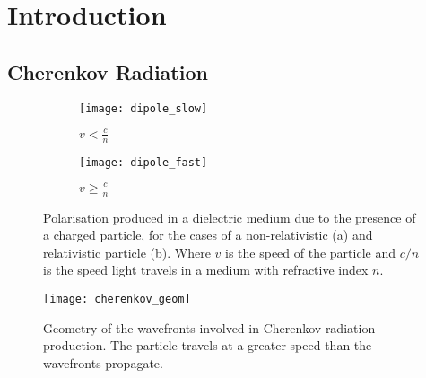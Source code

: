 \chapter{\label{ch1-intro}Introduction} 

\minitoc

\section{Cherenkov Radiation}

\begin{figure}
  \begin{subfigure}[b]{0.49\textwidth}
    \texttt{[image: dipole\_slow]}
    \caption{$v < \frac{c}{n}$}
    \label{fig:dipole_slow}
  \end{subfigure}
  \hfill
  \begin{subfigure}[b]{0.49\textwidth}
    \texttt{[image: dipole\_fast]}
    \caption{$v \ge \frac{c}{n}$}
    \label{fig:dipole_fast}
  \end{subfigure}
  \caption[Polarisation produced in a dielectric medium due to the presence of a charged particle.]{Polarisation produced in a dielectric medium due to the presence of a charged particle, for the cases of a non-relativistic (a) and relativistic particle (b). Where $v$ is the speed of the particle and $c/n$ is the speed light travels in a medium with refractive index $n$.}
\end{figure}

\begin{figure}
	\centering\texttt{[image: cherenkov\_geom]} 
	\caption[Geometry of the wavefronts involved in Cherenkov radiation production.]{Geometry of the wavefronts involved in Cherenkov radiation production. The particle travels at a greater speed than the wavefronts propagate.}
	\label{fig:cherenkov_geom}
\end{figure}

